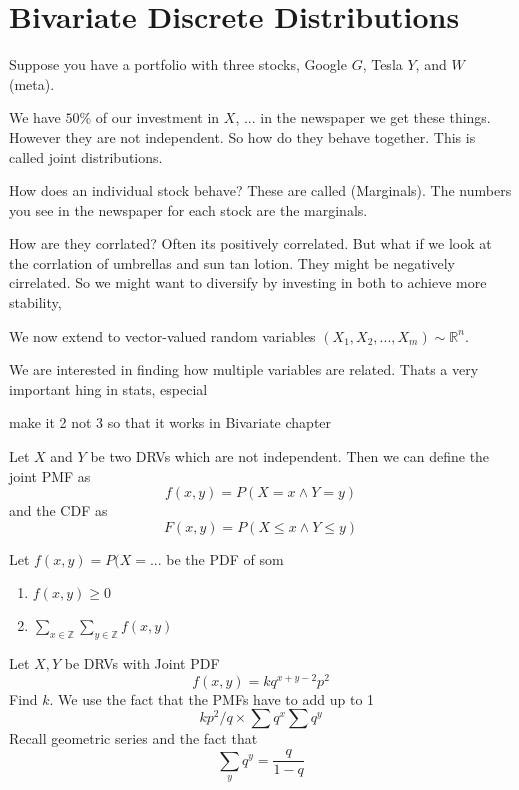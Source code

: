 \section{Bivariate Discrete Distributions}

Suppose you have a portfolio with three stocks, Google $G$, Tesla $Y$, and $W$ (meta).

We have $50\%$ of our investment in $X$, ... in the newspaper we get these things. However they are not independent. So how do they behave together. This  is called joint distributions. 

How does an individual stock behave? These are called (Marginals). The numbers you see in the newspaper for each stock are the marginals.

How are they corrlated? Often its positively correlated. But what if we look at the corrlation of umbrellas and sun tan lotion. They might be negatively cirrelated. So we might want to diversify by investing in both to achieve more stability, 


We now extend to vector-valued random variables $(X_1,X_2,...,X_m)\sim\mathbb R^n$. 

We are interested in finding how multiple variables are related. Thats a very important hing in stats, especial

\todo make it 2 not 3 so that it works in Bivariate chapter

Let $X$ and $Y$ be two DRVs which are not independent. Then we can define the joint PMF as
\[
    f(x,y)=P(X=x\land Y=y)
\]
and the CDF as
\[
    F(x,y)=P(X\le x \land Y\le y)
\]

\begin{theorem}
    Let $f(x,y) = P(X=...$ be the PDF of som
    \begin{enumerate}
        \item $f(x,y)\ge 0$
        \item $\sum_{x\in\mathbb Z} \sum_{y\in\mathbb Z} f(x,y)$
    \end{enumerate}
\end{theorem}

\begin{example}
    Let $X,Y$ be DRVs with Joint PDF
    \[
        f(x,y)=kq^{x+y-2}p^2
    \]
    Find $k$.
    \solution
    We use the fact that the PMFs have to add up to 1
    \[
        kp^2/q \times \sum q^x \sum q^y
    \]
    Recall geometric series and the fact that 
    \[
        \sum_y q^y = \frac q {1-q}
    \]
\end{example}

